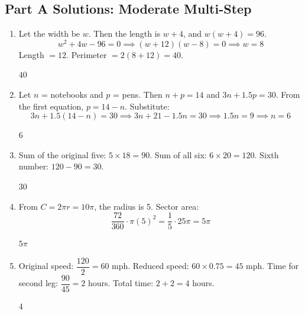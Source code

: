 \documentclass[14pt]{extarticle}
\begin{document}
\subsection*{Part A Solutions: Moderate Multi-Step}
\begin{enumerate}
  \item Let the width be \(w\). Then the length is \(w + 4\), and \(w(w + 4) = 96\).
  \[
  w^2 + 4w - 96 = 0 \implies (w + 12)(w - 8) = 0 \implies w = 8
  \]
  Length \(= 12\). Perimeter \(= 2(8 + 12) = 40\).

  \(\boxed{40}\)

  \item Let \(n\) = notebooks and \(p\) = pens. Then \(n + p = 14\) and \(3n + 1.5p = 30\). From the first equation, \(p = 14 - n\). Substitute:
  \[
  3n + 1.5(14 - n) = 30 \implies 3n + 21 - 1.5n = 30 \implies 1.5n = 9 \implies n = 6
  \]

  \(\boxed{6}\)

  \item Sum of the original five: \(5 \times 18 = 90\). Sum of all six: \(6 \times 20 = 120\). Sixth number: \(120 - 90 = 30\).

  \(\boxed{30}\)

  \item From \(C = 2\pi r = 10\pi\), the radius is 5. Sector area:
  \[
  \frac{72}{360} \cdot \pi(5)^2 = \frac{1}{5} \cdot 25\pi = 5\pi
  \]

  \(\boxed{5\pi}\)

  \item Original speed: \(\dfrac{120}{2} = 60\) mph. Reduced speed: \(60 \times 0.75 = 45\) mph. Time for second leg: \(\dfrac{90}{45} = 2\) hours. Total time: \(2 + 2 = 4\) hours.

  \(\boxed{4}\)
\end{enumerate}
\end{document}
